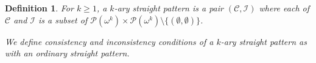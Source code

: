 \documentclass[10pt,a4paper]{amsart}
\newcommand{\calP}{\mathcal{P}}
\newcommand{\calC}{\mathcal{C}}
\newcommand{\calI}{\mathcal{I}}
\newtheorem{definition}{Definition}
\begin{document}



\begin{definition}\label{k-ary straight pattern}
    For $k\geq 1$, a $k$\textit{-ary straight pattern} is a pair $(\calC, \calI)$ where each of $\calC$ and $\calI$ is a subset of $\calP(\omega^{k})\times\calP(\omega^k)\setminus\{(\emptyset,\emptyset)\}$.

    We define consistency and inconsistency conditions of a $k$-ary straight pattern as with an ordinary straight pattern.
    
\end{definition}
\end{document}
